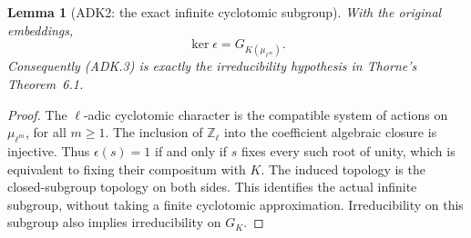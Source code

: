 \documentclass[11pt,a4paper]{article}
\numberwithin{equation}{section}
\newtheorem{lemma}[theorem]{Lemma}
\theoremstyle{remark}\newtheorem{remark}[theorem]{Remark}
\begin{document}
\begin{lemma}[ADK2: the exact infinite cyclotomic subgroup]
\label{claim:ADK2}
With the original embeddings,
\[
 \ker\epsilon=G_{K(\mu_{\ell^\infty})}.
 \tag{ADK.7}
\]
Consequently (ADK.3) is exactly the irreducibility hypothesis in
Thorne's Theorem~6.1.
\end{lemma}
\begin{proof}
The $\ell$-adic cyclotomic character is the compatible system of
actions on $\mu_{\ell^m}$, for all $m\ge1$.  The inclusion of
$\mathbb Z_\ell$ into the coefficient algebraic closure is
injective.  Thus $\epsilon(s)=1$ if and only if $s$ fixes every such
root of unity, which is equivalent to fixing their compositum with
$K$.  The induced topology is the closed-subgroup topology on both
sides.  This identifies the actual infinite subgroup, without taking
a finite cyclotomic approximation.  Irreducibility on this subgroup
also implies irreducibility on $G_K$.
\end{proof}
\end{document}
